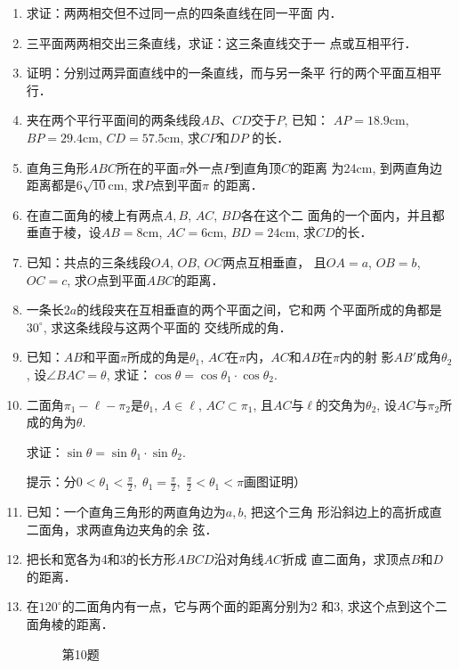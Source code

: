 \begin{enumerate}
\item 求证：两两相交但不过同一点的四条直线在同一平面
内．
\item 三平面两两相交出三条直线，求证：这三条直线交于一
点或互相平行．
\item 证明：分别过两异面直线中的一条直线，而与另一条平
行的两个平面互相平行．
\item 夹在两个平行平面间的两条线段$AB$、$CD$交于$P$, 已知：
$AP=18.9$cm, $BP=29.4$cm, $CD=57.5$cm, 求$CP$和$DP$
的长．
\item 直角三角形$ABC$所在的平面$\pi$外一点$P$到直角顶$C$的距离
为24cm, 到两直角边距离都是$6\sqrt{10}$cm, 求$P$点到平面$\pi$
的距离．
\item 在直二面角的棱上有两点$A,B$, $AC$, $BD$各在这个二
面角的一个面内，并且都垂直于棱，设$AB=8$cm, $AC
=6$cm, $BD=24$cm, 求$CD$的长．
\item 已知：共点的三条线段$OA$, $OB$, $OC$两点互相垂直，
且$OA=a$, $OB=b$, $OC=c$, 求$O$点到平面$ABC$的距离．
\item 一条长$2a$的线段夹在互相垂直的两个平面之间，它和两
个平面所成的角都是$30^{\circ}$, 求这条线段与这两个平面的
交线所成的角．

\item 已知：$AB$和平面$\pi$所成的角是$\theta_1$, 
$AC$在$\pi$内，$AC$和$AB$在$\pi$内的射
影$AB'$成角$\theta_2$, 设$\angle BAC=\theta$, 
求证：$\cos\theta=\cos\theta_1\cdot \cos\theta_2$.
\item 二面角$\pi_1-\ell-\pi_2$是$\theta_1$, $A\in\ell$, 
$AC\subset \pi_1$, 且$AC$与$\ell$的交角为$\theta_2$, 
设$AC$与$\pi_2$所成的角为$\theta$.

求证：$\sin\theta=\sin\theta_1\cdot \sin\theta_2$.

提示：分$0<\theta_1<\frac{\pi}{2},\; \theta_1=\frac{\pi}{2},\; \frac{\pi}{2}<\theta_1<\pi$画图证明）
\item 已知：一个直角三角形的两直角边为$a,b$, 把这个三角
形沿斜边上的高折成直二面角，求两直角边夹角的余
弦．
\item 把长和宽各为4和3的长方形$ABCD$沿对角线$AC$折成
直二面角，求顶点$B$和$D$的距离．
\item 在$120^{\circ}$的二面角内有一点，它与两个面的距离分别为2
和3, 求这个点到这个二面角棱的距离．

\begin{figure}[htp]\centering
{}
  \caption*{第10题}
  \end{figure}


\end{enumerate}
